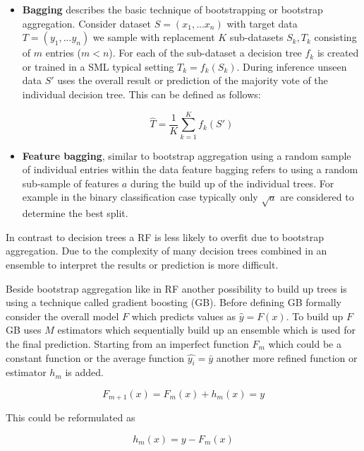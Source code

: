 \documentclass[../main.tex]{subfiles}
\begin{document}
\begin{itemize}
    \item \textbf{Bagging} describes the basic technique of bootstrapping or bootstrap aggregation. Consider dataset $S=(x_1,...x_n)$ with target data $T=(y_1,...y_n)$ we sample with replacement $K$ sub-datasets $S_k, T_k$ consisting of $m$ entries ($m<n$). For each of the sub-dataset a decision tree $f_k$ is created or trained in a SML typical setting $T_k=f_k(S_k)$. During inference unseen data $S'$ uses the overall result or prediction of the majority vote of the individual decision tree. This can be defined as follows:

    \begin{equation}
        \hat{T}=\frac{1}{K}\sum_{k=1}^{K}f_k(S')
    \end{equation}

    \item \textbf{Feature bagging}, similar to bootstrap aggregation using a random sample of individual entries within the data feature bagging refers to using a random sub-sample of features $a$ during the build up of the individual trees. For example in the binary classification case typically only $\sqrt{a}$ are considered to determine the best split.
\end{itemize}

In contrast to decision trees a RF is less likely to overfit due to bootstrap aggregation. Due to the complexity of many decision trees combined in an ensemble to interpret the results or prediction is more difficult.

 \label{par:gbdt}

Beside bootstrap aggregation like in RF another possibility to build up trees is using a technique called gradient boosting (GB). 
Before defining GB formally consider the overall model $F$ which predicts values as $\hat{y}=F(x)$. To build up $F$ GB uses $M$ estimators which sequentially build up an ensemble which is used for the final prediction. Starting from an imperfect function $F_m$ which could be a constant function or the average function $\hat{y_i}=\bar{y}$ another more refined function or estimator $h_m$ is added.

\begin{equation}
    F_{m+1}(x)=F_m(x)+h_m(x)=y 
\end{equation}

This could be reformulated as

\begin{equation}
    h_m(x)=y-F_m(x)
\end{equation}
\end{document}
